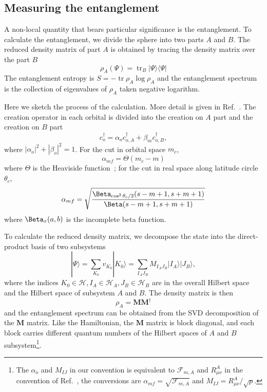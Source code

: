 \documentclass{timesjhep}
\begin{document}
\subsection{Measuring the entanglement}
\label{sec:ed_ent}

A non-local quantity that bears particular significance is the entanglement. To calculate the entanglement, we divide the sphere into two parts $A$ and $B$. The reduced density matrix of part $A$ is obtained by tracing the density matrix over the part $B$
\begin{equation}
    \rho_A(\Psi)=\operatorname{tr}_B|\Psi\rangle\langle\Psi|
\end{equation}
The entanglement entropy is $S=-\operatorname{tr}\rho_A\log\rho_A$ and the entanglement spectrum is the collection of eigenvalues of $\rho_A$ taken negative logarithm.

Here we sketch the process of the calculation. More detail is given in Ref.~\cite{Sterdyniak2011RealEnt}. The creation operator in each orbital is divided into the creation on $A$ part and the creation on $B$ part
\begin{equation}
    c^\dagger_o=\alpha_oc^\dagger_{o,A}+\beta_mc^\dagger_{o,B},
\end{equation}
where $|\alpha_o|^2+|\beta_o|^2=1$. For the cut in orbital space $m_c$,
\begin{equation*}
    \alpha_{mf}=\Theta(m_c-m)
\end{equation*}
where $\Theta$ is the Heaviside function~; for the cut in real space along latitude circle $\theta_c$,
\begin{equation*}
    \alpha_{mf}=\sqrt{\frac{\Beta_{\cos^2\theta_c/2}(s-m+1,s+m+1)}{\Beta(s-m+1,s+m+1)}}
\end{equation*}
where $\Beta_x(a,b)$ is the incomplete beta function.

To calculate the reduced density matrix, we decompose the state into the direct-product basis of two subsystems
\begin{equation}
    |\Psi\rangle=\sum_{K_0}v_{K_0}|K_0\rangle=\sum_{I_AJ_B}M_{I_AJ_B}|I_A\rangle|J_B\rangle,
\end{equation}
where the indices $K_0\in\mathcal{H},I_A\in\mathcal{H}_A,J_B\in\mathcal{H}_B$ are in the overall Hilbert space and the Hilbert space of subsystem $A$ and $B$. The density matrix is then
\begin{equation}
    \rho_A=\mathbf{M}\mathbf{M}^\dagger
\end{equation}
and the entanglement spectrum can be obtained from the SVD decomposition of the $\mathbf{M}$ matrix. Like the Hamiltonian, the $\mathbf{M}$ matrix is block diagonal, and each block carries different quantum numbers of the Hilbert spaces of $A$ and $B$ subsystem\footnote{The $\alpha_o$ and $M_{IJ}$ in our convention is equivalent to $\mathcal{F}_{m,A}$ and $R_{\mu\nu}^A$ in the convention of Ref.~\cite{Sterdyniak2011RealEnt}, the conversions are $\alpha_{mf}=\sqrt{\mathcal{F}_{m,A}}$ and $M_{IJ}=R_{\mu\nu}^A/\sqrt{p}$.}.
\end{document}
